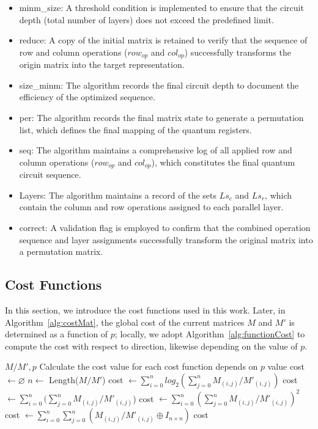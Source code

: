 \begin{itemize}
    \item minm\_size: A threshold condition is implemented to ensure that the circuit depth (total number of layers) does not exceed the predefined limit.
    \item reduce: A copy of the initial matrix is retained to verify that the sequence of row and column operations ($row_{op}$ and $col_{op}$) successfully transforms the origin matrix into the target representation.
    \item size\_minm: The algorithm records the final circuit depth to document the efficiency of the optimized sequence.
    \item per: The algorithm records the final matrix state to generate a permutation list, which defines the final mapping of the quantum registers.
    \item seq: The algorithm maintains a comprehensive log of all applied row and column operations ($row_{op}$ and $col_{op}$), which constitutes the final quantum circuit sequence.
    \item Layers: The algorithm maintains a record of the sets $Ls_{c}$ and $Ls_{r}$, which contain the column and row operations assigned to each parallel layer.
    \item correct: A validation flag is employed to confirm that the combined operation sequence and layer assignments successfully transform the original matrix into a permutation matrix.
\end{itemize}

\subsection{Cost Functions}

In this section, we introduce the cost functions used in this work. Later, in Algorithm~\ref{alg:costMat}, the global cost of the current matrices $M$ and $M'$ is determined as a function of $p$; locally, we adopt Algorithm~\ref{alg:functionCost} to compute the cost with respect to direction, likewise depending on the value of $p$.

\begin{algorithm}[htbp]
\caption{costMat}
\label{alg:costMat}
\begin{algorithmic}[1]
\Require $M/M', p$
\Ensure Calculate the cost value for each cost function depends on $p$ value
\State cost $\leftarrow \varnothing$
\State $n \leftarrow $ Length($M/M'$)
		\State cost $\leftarrow \sum_{i=0}^{n} log_{2}(\sum_{j=0}^{n} M_{(i, j)}/M'_{(i, j)})$
	\EndCase
		\State cost $\leftarrow \sum_{i=0}^{n}(\sum_{j=0}^{n}M_{(i, j)}/M'_{(i,j)}$)
	\EndCase
		\State cost $\leftarrow \sum_{i=0}^{n}(\sum_{j=0}^{n}M_{(i,j)}/M'_{(i,j)})^{2}$
	\EndCase
		\State cost $\leftarrow \sum_{i=0}^{n}\sum_{j=0}^{n}(M_{(i,j)}/M'_{(i,j)} \oplus I_{n \times n})$
	\EndCase
\EndMatch
\State \Return cost
\end{algorithmic}
\end{algorithm}


